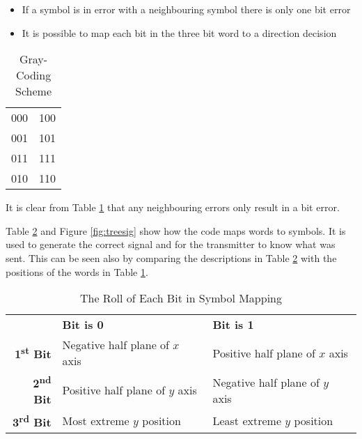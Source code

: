 \documentclass[A4, 12pt]{article}
\begin{document}
\begin{itemize}
	\item If a symbol is in error with a neighbouring symbol there is only one bit error
	\item It is possible to map each bit in the three bit word to a direction decision
\end{itemize}

\begin{table}[H]
	\centering
	\caption{Gray-Coding Scheme}
	\begin{tabular}{ c c }
		000 & 100\\
		001 & 101\\
		011 & 111\\
		010 & 110\\
	\end{tabular}
	\label{tab:gray}
\end{table}

It is clear from Table \ref{tab:gray} that any neighbouring errors only result in a bit error.
\par
Table \ref{tab:bit} and Figure \ref{fig:treesig} show how the code maps words to symbols.
It is used to generate the correct signal and for the transmitter to know what was sent.
This can be seen also by comparing the descriptions in Table \ref{tab:bit} with the positions of the words in Table \ref{tab:gray}.

\begin{table}[H]
	\centering
	\caption{The Roll of Each Bit in Symbol Mapping}
	\begin{tabular}{r  l  l}
		& \textbf{Bit is 0} & \textbf{Bit is 1}\\
		\textbf{1\textsuperscript{st} Bit} & Negative half plane of $x$ axis & Positive half plane of $x$ axis \\
		\textbf{2\textsuperscript{nd} Bit} & Positive half plane of $y$ axis & Negative half plane of $y$ axis \\
		\textbf{3\textsuperscript{rd} Bit} & Most extreme $y$ position & Least extreme $y$ position \\
	\end{tabular}
	\label{tab:bit}
\end{table}
\end{document}
